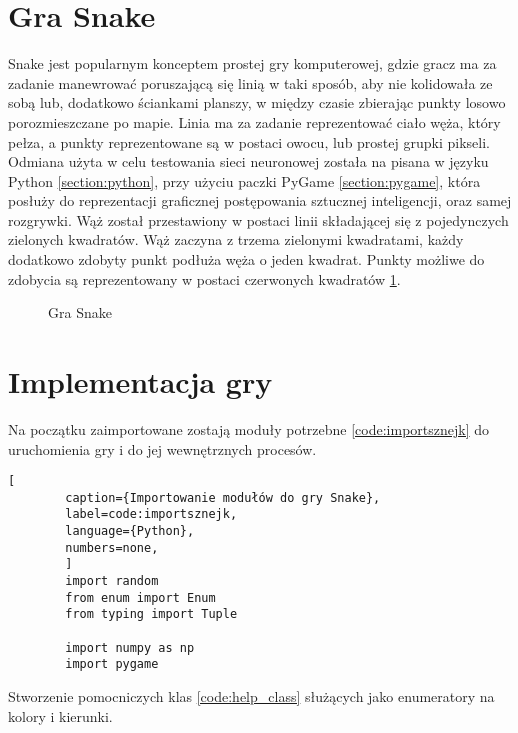 


\section{Gra Snake}

Snake \cite{SnakeGame} jest popularnym konceptem prostej gry komputerowej, gdzie gracz ma za zadanie manewrować poruszającą się linią w taki sposób, aby nie kolidowała ze sobą lub, dodatkowo ściankami planszy, w między czasie zbierając punkty losowo porozmieszczane po mapie. Linia ma za zadanie reprezentować ciało węża, który pełza, a punkty reprezentowane są w postaci owocu, lub prostej grupki pikseli.
Odmiana użyta w celu testowania sieci neuronowej została na pisana w języku Python \ref{section:python}, przy użyciu paczki PyGame \ref{section:pygame}, która posłuży do reprezentacji graficznej postępowania sztucznej inteligencji, oraz samej rozgrywki.
Wąż został przestawiony w postaci linii składającej się z pojedynczych zielonych kwadratów. Wąż zaczyna z trzema zielonymi kwadratami, każdy dodatkowo zdobyty punkt podłuża węża o jeden kwadrat. Punkty możliwe do zdobycia są reprezentowany w postaci czerwonych kwadratów \ref{img:snake_game}.

\begin{figure}[h!]
    \centering
    \caption{Gra Snake}
    \label{img:snake_game}
\end{figure}


\section{Implementacja gry}


Na początku zaimportowane zostają moduły potrzebne \ref{code:importsznejk} do uruchomienia gry i do jej wewnętrznych procesów.


\begin{onepage}
    \begin{lstlisting}[
        caption={Importowanie modułów do gry Snake},
        label=code:importsznejk,
        language={Python},
        numbers=none,
        ]
        import random
        from enum import Enum
        from typing import Tuple
        
        import numpy as np
        import pygame
    \end{lstlisting}
\end{onepage}



Stworzenie pomocniczych klas \ref{code:help_class} służących jako enumeratory na kolory i kierunki.


